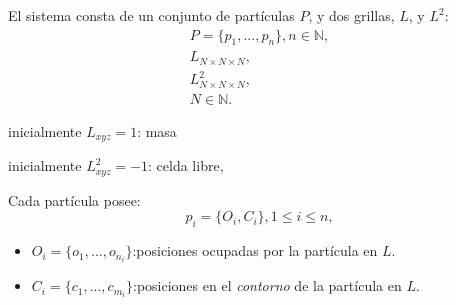 \documentclass[spanish]{beamer}
\begin{document}
\begin{frame}
El sistema consta de un conjunto de partículas $P$, y dos grillas, $L$, y $L^{2}$:
\begin{align*}
  P = \{p_{1}, ... , p_{n}\}, n  \in \mathbb{N}, \\
  L_{N\times N \times N},\\
  L^{2}_{N\times N \times N},\\ N \in \mathbb{N}.
\end{align*}

inicialmente $L_{xyz}=1$: masa

inicialmente $L^{2}_{xyz}=-1$: celda libre,

Cada partícula posee:
\begin{equation*}
  p_{i} = \{O_{i}, C_{i}\}, 1 \le i \le n,
\end{equation*}

\begin{itemize}
\item $O_{i} = \{o_{1}, ... , o_{n_{i}}\}$:posiciones ocupadas por la part\'icula en $L$.

\item $C_{i} = \{c_{1}, ... , c_{m_{i}}\}$:posiciones en el {\em contorno} de la part\'icula en $L$.
\end{itemize}

\end{frame}

\begin{frame}

\begin{algorithm}[H]
\begin{algorithmic}[1]
        \ENDIF
            \ENDIF
        \ENDFOR
\end{algorithmic}
\end{algorithm}
\end{frame}
\end{document}
